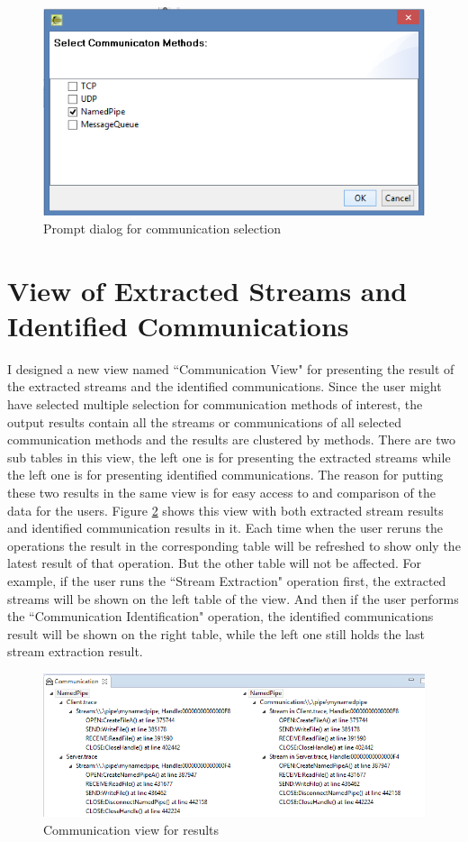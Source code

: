 \begin{figure}[H]
\centerline{\includegraphics[scale=0.8]{Figures/methods}}
 \caption{Prompt dialog for communication selection}
\label{methods}
\end{figure}


\section{View of Extracted Streams and Identified Communications}
I designed a new view named ``Communication View" for presenting the result of the extracted streams and the identified communications. Since the user might have selected multiple selection for communication methods of interest, the output results contain all the streams or communications of all selected communication methods and the results are clustered by methods. There are two sub tables in this view, the left one is for presenting the extracted streams while the left one is for presenting identified communications. The reason for putting these two results in the same view is for easy access to and comparison of the data for the users. Figure \ref{idenview} shows this view with both extracted stream results and identified communication results in it. Each time when the user reruns the operations the result in the corresponding table will be refreshed to show only the latest result of that operation. But the other table will not be affected. For example, if the user runs the ``Stream Extraction" operation first, the extracted streams will be shown on the left table of the view. And then if the user performs the ``Communication Identification" operation, the identified communications result will be shown on the right table, while the left one still holds the last stream extraction result.

\begin{figure}[H]
\centerline{\includegraphics[scale=0.8]{Figures/idenview}}
 \caption{Communication view for results}
\label{idenview}
\end{figure}

